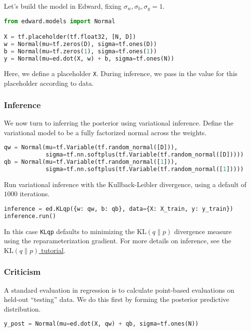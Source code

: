Let's build the model in Edward, fixing $\sigma_w,\sigma_b,\sigma_y=1$.
\begin{lstlisting}[language=Python]
from edward.models import Normal

X = tf.placeholder(tf.float32, [N, D])
w = Normal(mu=tf.zeros(D), sigma=tf.ones(D))
b = Normal(mu=tf.zeros(1), sigma=tf.ones(1))
y = Normal(mu=ed.dot(X, w) + b, sigma=tf.ones(N))
\end{lstlisting}
Here, we define a placeholder \texttt{X}. During inference, we pass in
the value for this placeholder according to data.

\subsubsection{Inference}

We now turn to inferring the posterior using variational inference.
Define the variational model to be a fully factorized normal across
the weights.
\begin{lstlisting}[language=Python]
qw = Normal(mu=tf.Variable(tf.random_normal([D])),
            sigma=tf.nn.softplus(tf.Variable(tf.random_normal([D]))))
qb = Normal(mu=tf.Variable(tf.random_normal([1])),
            sigma=tf.nn.softplus(tf.Variable(tf.random_normal([1]))))
\end{lstlisting}

Run variational inference with the Kullback-Leibler divergence, using a
default of $1000$ iterations.
\begin{lstlisting}[language=Python]
inference = ed.KLqp({w: qw, b: qb}, data={X: X_train, y: y_train})
inference.run()
\end{lstlisting}
In this case \texttt{KLqp} defaults to minimizing the
$\text{KL}(q\|p)$ divergence measure using the reparameterization
gradient.
For more details on inference, see the \href{/tutorials/klqp}{$\text{KL}(q\|p)$ tutorial}.

\subsubsection{Criticism}

A standard evaluation in regression is to calculate point-based evaluations on
held-out ``testing'' data. We do this first by forming the posterior predictive
distribution.
\begin{lstlisting}[language=Python]
y_post = Normal(mu=ed.dot(X, qw) + qb, sigma=tf.ones(N))
\end{lstlisting}

